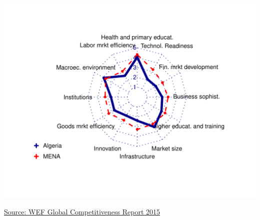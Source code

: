 \documentclass{article}\usepackage[]{graphicx}\usepackage[]{color}
\makeatletter
\def\maxwidth{ %
  \ifdim\Gin@nat@width>\linewidth
    \linewidth
  \else
    \Gin@nat@width
  \fi
}
\makeatother
\begin{document}

\newpage

\begin{minipage}[t]{0.99\textwidth}
  \vspace{0.5cm}
  \begin{minipage}[c]{0.48\textwidth} %
    \vspace*{-0.6cm}


{\centering \includegraphics[width=\maxwidth]{figure/WEFradar-1} 

}



    \vspace*{-1.2cm} 
    \hspace*{0.3cm} \raggedright\footnotesize{\href{http://www.weforum.org/reports/global-competitiveness-report-2015-2016}{Source: WEF Global Competitiveness Report 2015}}
  \end{minipage}
  \begin{minipage}[c]{0.50\textwidth} %
    \vspace*{0.4cm}



\end{minipage}
\end{minipage}
\end{document}
